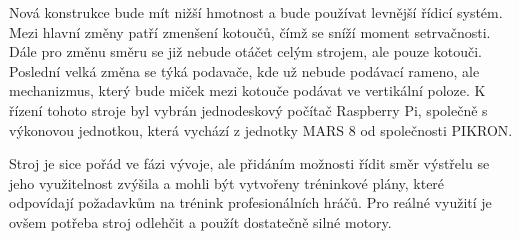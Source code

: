 Nová konstrukce bude mít nižší hmotnost a bude používat levnější řídicí systém. Mezi hlavní změny patří zmenšení kotoučů, čímž se sníží moment setrvačnosti. Dále pro změnu směru se již nebude otáčet celým strojem, ale pouze kotouči. Poslední velká změna se týká podavače, kde už nebude podávací rameno, ale mechanizmus, který bude miček mezi kotouče podávat ve vertikální poloze. K řízení tohoto stroje byl vybrán jednodeskový počítač Raspberry Pi, společně s výkonovou jednotkou, která vychází z jednotky MARS 8 od společnosti PIKRON.

Stroj je sice pořád ve fázi vývoje, ale přidáním možnosti řídit směr výstřelu se jeho využitelnost zvýšila a mohli být vytvořeny tréninkové plány, které odpovídají požadavkům na trénink profesionálních hráčů. Pro reálné využití je ovšem potřeba stroj odlehčit a použít dostatečně silné motory. 




